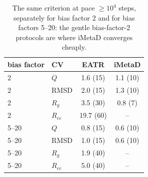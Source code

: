\begin{table}[H]\centering
\caption{The same criterion at pace $\ge 10^4$ steps, separately for bias factor 2 and for bias factors 5--20: the gentle bias-factor-2 protocols are where iMetaD converges cheaply.}\label{tab:s4}
\begin{tabular}{llcc}\toprule
bias factor & CV & EATR & iMetaD\\ \midrule
2 & $Q$ & 1.6 (15) & 1.1 (10) \\
2 & RMSD & 2.0 (15) & 1.3 (10) \\
2 & $R_g$ & 3.5 (30) & 0.8 (7) \\
2 & $R_{ee}$ & 19.7 (60) & -- \\
5--20 & $Q$ & 0.8 (15) & 0.6 (10) \\
5--20 & RMSD & 1.0 (15) & 0.6 (10) \\
5--20 & $R_g$ & 1.9 (40) & -- \\
5--20 & $R_{ee}$ & 5.0 (40) & --\\ \bottomrule
\end{tabular}
\end{table}
